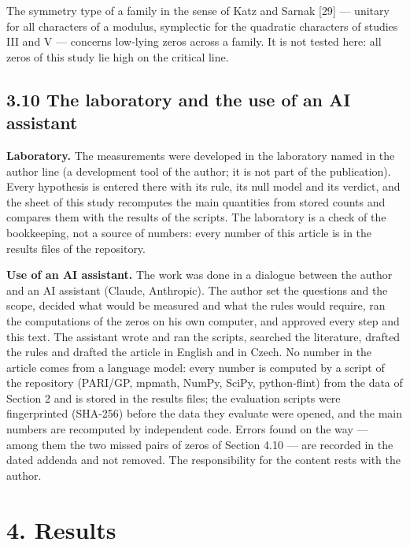 \documentclass[
  10pt,
]{article}
\begin{document}
The symmetry type of a family in the sense of Katz and Sarnak {[}29{]}
--- unitary for all characters of a modulus, symplectic for the
quadratic characters of studies III and V --- concerns low-lying zeros
across a family. It is not tested here: all zeros of this study lie high
on the critical line.

\hypertarget{the-laboratory-and-the-use-of-an-ai-assistant}{%
\subsection{3.10 The laboratory and the use of an AI
assistant}\label{the-laboratory-and-the-use-of-an-ai-assistant}}

\textbf{Laboratory.} The measurements were developed in the laboratory
named in the author line (a development tool of the author; it is not
part of the publication). Every hypothesis is entered there with its
rule, its null model and its verdict, and the sheet of this study
recomputes the main quantities from stored counts and compares them with
the results of the scripts. The laboratory is a check of the
bookkeeping, not a source of numbers: every number of this article is in
the results files of the repository.

\textbf{Use of an AI assistant.} The work was done in a dialogue between
the author and an AI assistant (Claude, Anthropic). The author set the
questions and the scope, decided what would be measured and what the
rules would require, ran the computations of the zeros on his own
computer, and approved every step and this text. The assistant wrote and
ran the scripts, searched the literature, drafted the rules and drafted
the article in English and in Czech. No number in the article comes from
a language model: every number is computed by a script of the repository
(PARI/GP, mpmath, NumPy, SciPy, python-flint) from the data of Section 2
and is stored in the results files; the evaluation scripts were
fingerprinted (SHA-256) before the data they evaluate were opened, and
the main numbers are recomputed by independent code. Errors found on the
way --- among them the two missed pairs of zeros of Section 4.10 --- are
recorded in the dated addenda and not removed. The responsibility for
the content rests with the author.

\hypertarget{results}{%
\section{4. Results}\label{results}}
\end{document}
